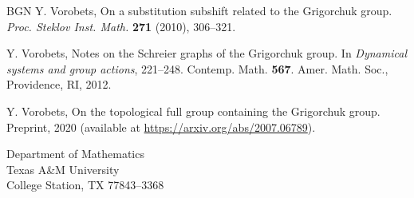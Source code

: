 \documentclass[12pt]{article}
\theoremstyle{definition}
\begin{document}
\begin{thebibliography}{BGN}
Y. Vorobets, On a substitution subshift related to the Grigorchuk group.
\emph{Proc. Steklov Inst. Math.} {\bf 271} (2010), 306--321.

Y. Vorobets, Notes on the Schreier graphs of the Grigorchuk group. In 
\emph{Dynamical systems and group actions}, 221--248.  Contemp. Math. 
\textbf{567}. Amer. Math. Soc., Providence, RI, 2012.

Y. Vorobets, On the topological full group containing the Grigorchuk group. 
Preprint, 2020 (available at \url{https://arxiv.org/abs/2007.06789}).

\end{thebibliography}

\bigskip

{\sc
\begin{raggedright}
Department of Mathematics\\
Texas A\&M University\\
College Station, TX 77843--3368
\end{raggedright}
}
\end{document}

